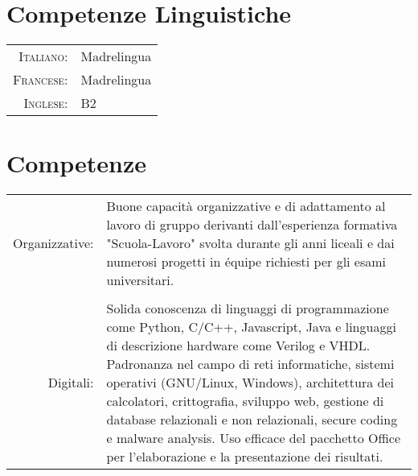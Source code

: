 \documentclass[a4paper,10pt]{article} %
\begin{document}

\section{Competenze Linguistiche}

\begin{tabular}{rl}

\textsc{Italiano:} & Madrelingua\\

\textsc{Francese:} & Madrelingua\\

\textsc{Inglese:} & B2\\
\end{tabular}


\section{Competenze}

\begin{tabular}{rl}
\multicolumn{1}{p{2cm}}{Organizzative:} & \multicolumn{1}{p{11.5cm}}{Buone capacità organizzative e di adattamento al lavoro di gruppo derivanti dall'esperienza formativa "Scuola-Lavoro" svolta durante gli anni liceali e dai numerosi progetti in équipe richiesti per gli esami universitari.}\\
\\

\multicolumn{1}{p{2cm}}{Digitali:} & \multicolumn{1}{p{11.5cm}}{Solida conoscenza di linguaggi di programmazione come Python, C/C++, Javascript, Java e linguaggi di descrizione hardware come Verilog e VHDL. Padronanza nel campo di reti informatiche, sistemi operativi (GNU/Linux, Windows), architettura dei calcolatori, crittografia, sviluppo web, gestione di database relazionali e non relazionali, secure coding e malware analysis. Uso efficace del pacchetto Office per l'elaborazione e la presentazione dei risultati.}\\
\end{tabular}

\end{document}

